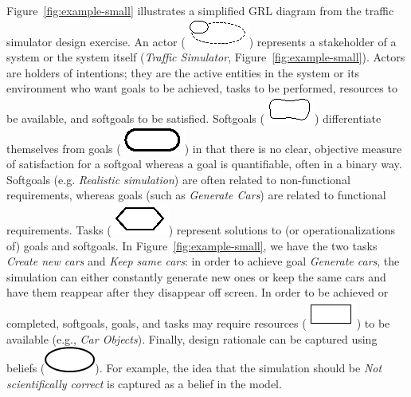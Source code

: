 Figure~\ref{fig:example-small} illustrates a simplified GRL diagram from the traffic simulator design exercise. An actor (\includegraphics[scale=1]{img/actor}) represents a stakeholder of a system or the system itself (\emph{Traffic Simulator}, Figure~\ref{fig:example-small}). Actors are holders of intentions; they are the active entities in the system or its environment who want goals to be achieved, tasks to be performed, resources to be available, and softgoals to be satisfied. Softgoals (\includegraphics[scale=1]{img/softgoal}) differentiate themselves from goals (\includegraphics[scale=1]{img/goal}) in that there is no clear, objective measure of satisfaction for a softgoal whereas a goal is quantifiable, often in a binary way. Softgoals (e.g. \emph{Realistic simulation}) are often related to non-functional requirements, whereas goals (such as \emph{Generate Cars}) are related to functional requirements. Tasks (\includegraphics[scale=1]{img/task}) represent solutions to (or operationalizations of) goals and softgoals. In Figure~\ref{fig:example-small}, we have the two tasks \emph{Create new cars} and \emph{Keep same cars}: in order to achieve goal \emph{Generate cars}, the simulation can either constantly generate new ones or keep the same cars and have them reappear after they disappear off screen. In order to be achieved or completed, softgoals, goals, and tasks may require resources (\includegraphics[scale=1]{img/resource}) to be available (e.g., \emph{Car Objects}). Finally, design rationale can be captured using beliefs (\includegraphics[scale=0.3]{img/belief}). For example, the idea that the simulation should be \emph{Not scientifically correct} is captured as a belief in the model. 

